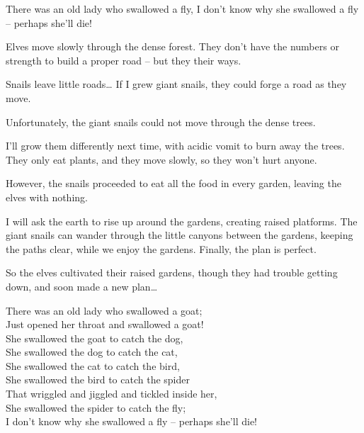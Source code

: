 \begin{exampletext}
  There was an old lady who swallowed a fly,
  I don't know why she swallowed a fly – perhaps she'll die!
\end{exampletext}

Elves move slowly through the dense forest.
They don't have the numbers or strength to build a proper road -- but they their ways.

\begin{exampletext}
  Snails leave little roads\ldots
  If I grew giant snails, they could forge a road as they move.
\end{exampletext}

Unfortunately, the giant snails could not move through the dense trees.

\begin{exampletext}
  I'll grow them differently next time, with acidic vomit to burn away the trees.
  They only eat plants, and they move slowly, so they won't hurt anyone.
\end{exampletext}

However, the snails proceeded to eat all the food in every garden, leaving the elves with nothing.

\begin{exampletext}
  I will ask the earth to rise up around the gardens, creating raised platforms.
  The giant snails can wander through the little canyons between the gardens, keeping the paths clear, while we enjoy the gardens.
  Finally, the plan is perfect.
\end{exampletext}

So the elves cultivated their raised gardens, though they had trouble getting down, and soon made a new plan\ldots

\begin{exampletext}
  \noindent
  There was an old lady who swallowed a goat; \\
  Just opened her throat and swallowed a goat! \\
  She swallowed the goat to catch the dog, \\
  She swallowed the dog to catch the cat, \\
  She swallowed the cat to catch the bird, \\
  She swallowed the bird to catch the spider \\
  That wriggled and jiggled and tickled inside her, \\
  She swallowed the spider to catch the fly; \\
  I don't know why she swallowed a fly – perhaps she'll die! \\
\end{exampletext}

